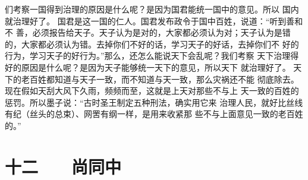 \documentclass[12pt,UTF8]{ctexbook}
\begin{document}
们考察一国得到治理的原因是什么呢？是因为国君能统一国中的意见。所以 
国内就治理好了。 
国君是这一国的仁人。国君发布政令于国中百姓，说道：“听到善和不 
善，必须报告给天子。天子认为是对的，大家都必须认为对；天子认为是错 
的，大家都必须认为错。去掉你们不好的话，学习天子的好话，去掉你们不 
好的行为，学习天子的好行为。”那么，还怎么能说天下会乱呢？我们考察 
天下治理得好的原因是什么呢？是因为天子能够统一天下的意见，所以天下 
就治理好了。 
天下的老百姓都知道与天子一致，而不知道与天一致，那么灾祸还不能 
彻底除去。现在假如天刮大风下久雨，频频而至，这就是上天对那些不与上 
天一致的百姓的惩罚。所以墨子说：“古时圣王制定五种刑法，确实用它来 
治理人民，就好比丝线有纪（丝头的总束）、网罟有纲一样，是用来收紧那 
些不与上面意见一致的老百姓的。” 

\chapter{十二　　尚同中}
\end{document}
